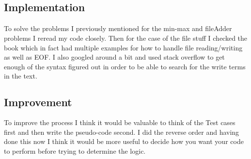 \documentclass[a4paper, 11pt]{article}
\begin{document}
\subsection*{Implementation}
	\paragraph{} 
	To solve the problems I previously mentioned for the min-max and fileAdder problems I reread my code closely. Then for the case of the file stuff I checked the book which in fact had multiple examples for how to handle file reading/writing as well as EOF. I also googled around a bit and used stack overflow to get enough of the syntax figured out in order to be able to search for the write terms in the text. 
\subsection*{Improvement} 
	To improve the process I think it would be valuable to think of the Test cases first and then write the pseudo-code second. I did the reverse order and having done this now  I think it would be more useful to decide how you want your code to perform before trying to determine the logic. 
		
		
\end{document}
